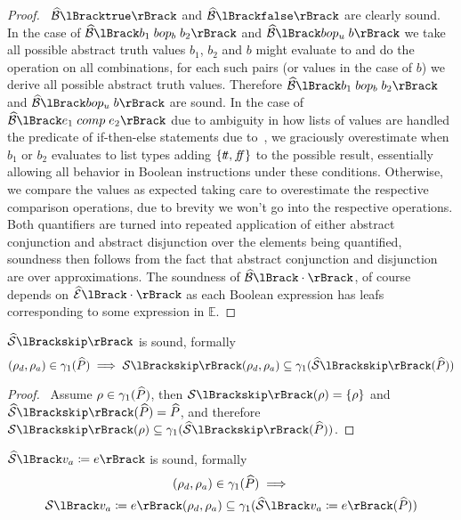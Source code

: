 \begin{proof}
    \pfsketch\
    $\absboolsem{\texttt{true}}$ and $\absboolsem{\texttt{false}}$ are clearly sound.
    In the case of $\absboolsem{b_1 \; bop_b \; b_2}$ and $\absboolsem{bop_u \; b}$ we take all possible abstract truth values $b_1$, $b_2$ and $b$ might evaluate to and do the operation on all combinations, for each such pairs (or values in the case of $b$) we derive all possible abstract truth values.
    Therefore $\absboolsem{b_1 \; bop_b \; b_2}$ and $\absboolsem{bop_u \; b}$ are sound.
    In the case of $\absboolsem{e_1 \; comp \; e_2}$ due to ambiguity in how lists of values are handled the predicate of if-then-else statements due to~\cite{halder_abstract_2012}, we graciously overestimate when $b_1$ or $b_2$ evaluates to list types adding $\{t\!t, f\!\!f\}$ to the possible result, essentially allowing all behavior in Boolean instructions under these conditions.
    Otherwise, we compare the values as expected taking care to overestimate the respective comparison operations, due to brevity we won't go into the respective operations.
    Both quantifiers are turned into repeated application of either abstract conjunction and abstract disjunction over the elements being quantified, soundness then follows from the fact that abstract conjunction and disjunction are over approximations.
    The soundness of $\absboolsem{\cdot}$, of course depends on $\absexpsem{\cdot}$ as each Boolean expression has leafs corresponding to some expression in $\mathbb{E}$.
\end{proof}


\begin{conjecture}
    \label{thm:sound-skip}
    $\abssem{\texttt{skip}}$ is sound, formally
    \begin{equation*}
    (\rho_d, \rho_a)
        \in \concrete_1(\ab{P}) \implies \sem{\texttt{skip}}(\rho_d, \rho_a) \subseteq \concrete_1(\abssem{\texttt{skip}}(\ab{P}))
    \end{equation*}
\end{conjecture}

\begin{proof}
    \pf\ Assume $\rho \in \gamma_1(\widehat{P})$, then $\sem{\texttt{skip}}(\rho) = \{\rho\}$ and $\abssem{\texttt{skip}}(\ab{P}) = \ab{P}$, and therefore $\sem{\texttt{skip}}(\rho) \subseteq \concrete_1(\abssem{\texttt{skip}}(\ab{P}))$.
\end{proof}


\begin{conjecture}
    \label{thm:sound-assign}
    $\abssem{v_a \coloneqq e}$ is sound, formally
    \begin{multline*}
    (\rho_d, \rho_a)
        \in \concrete_1(\ab{P}) \implies \\
        \sem{v_a \coloneqq e}(\rho_d, \rho_a) \subseteq \concrete_1(\abssem{v_a \coloneqq e}(\ab{P}))
    \end{multline*}
\end{conjecture}



